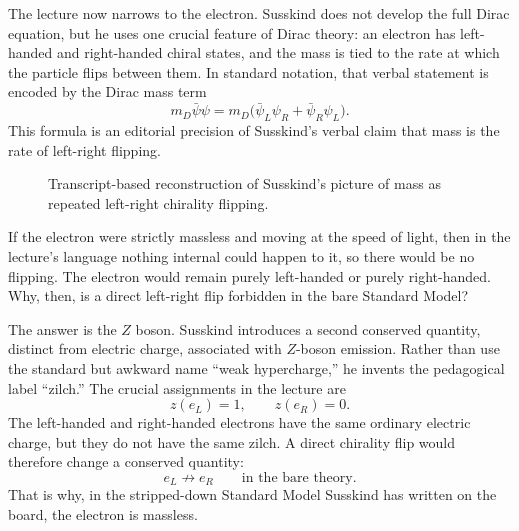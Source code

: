 The lecture now narrows to the electron. Susskind does not develop the full Dirac equation, but he uses one crucial feature of Dirac theory: an electron has left-handed and right-handed chiral states, and the mass is tied to the rate at which the particle flips between them. In standard notation, that verbal statement is encoded by the Dirac mass term
\begin{equation}
m_{D}\bar\psi\psi
=
m_{D}\bigl(\bar\psi_{L}\psi_{R}+\bar\psi_{R}\psi_{L}\bigr).
\end{equation}
This formula is an editorial precision of Susskind's verbal claim that mass is the rate of left-right flipping.

\begin{figure}
\centering
{}
\caption{Transcript-based reconstruction of Susskind's picture of mass as repeated left-right chirality flipping.}
\end{figure}

If the electron were strictly massless and moving at the speed of light, then in the lecture's language nothing internal could happen to it, so there would be no flipping. The electron would remain purely left-handed or purely right-handed. Why, then, is a direct left-right flip forbidden in the bare Standard Model?

The answer is the \(Z\) boson. Susskind introduces a second conserved quantity, distinct from electric charge, associated with \(Z\)-boson emission. Rather than use the standard but awkward name ``weak hypercharge,'' he invents the pedagogical label ``zilch.'' The crucial assignments in the lecture are
\begin{equation}
z(e_{L})=1,\qquad z(e_{R})=0.
\end{equation}
The left-handed and right-handed electrons have the same ordinary electric charge, but they do not have the same zilch. A direct chirality flip would therefore change a conserved quantity:
\begin{equation}
e_{L}\not\to e_{R}\qquad \text{in the bare theory.}
\end{equation}
That is why, in the stripped-down Standard Model Susskind has written on the board, the electron is massless.

